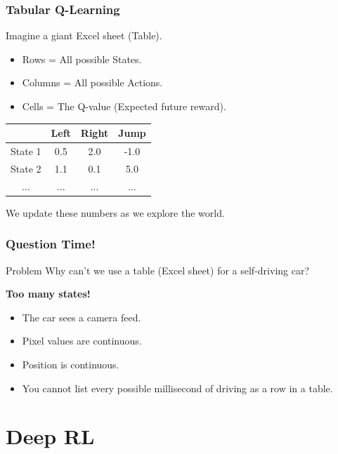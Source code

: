\documentclass[aspectratio=169]{beamer}
\begin{document}
\begin{frame}
    \frametitle{Tabular Q-Learning}
    Imagine a giant Excel sheet (Table).
    \begin{itemize}
        \item Rows = All possible States.
        \item Columns = All possible Actions.
        \item Cells = The Q-value (Expected future reward).
    \end{itemize}

    \begin{center}
    \begin{tabular}{|c|c|c|c|}
    \hline
     & \textbf{Left} & \textbf{Right} & \textbf{Jump} \\
    \hline
    State 1 & 0.5 & 2.0 & -1.0 \\
    \hline
    State 2 & 1.1 & 0.1 & 5.0 \\
    \hline
    ... & ... & ... & ... \\
    \hline
    \end{tabular}
    \end{center}

    We update these numbers as we explore the world.
\end{frame}

\begin{frame}
    \frametitle{Question Time!}
    \begin{alertblock}{Problem}
        Why can't we use a table (Excel sheet) for a self-driving car?
    \end{alertblock}
    \pause
    \textbf{Too many states!}
    \begin{itemize}
        \item The car sees a camera feed.
        \item Pixel values are continuous.
        \item Position is continuous.
        \item You cannot list every possible millisecond of driving as a row in a table.
    \end{itemize}
\end{frame}

\section{Deep RL}
\end{document}
